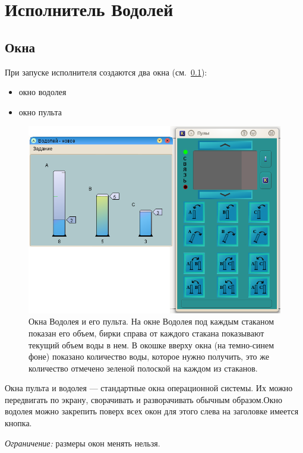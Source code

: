 \chapter*{Исполнитель Водолей}
\addtocounter{chapter}{1}


\section{Окна}

При запуске исполнителя создаются два окна (см.~\ref{vodoley}):
\begin{itemize}
\item окно водолея
\item окно пульта
\end{itemize}
\begin{figure}[h]
	\begin{center}
		\includegraphics[scale=0.6]{vodoley.png}
	\end{center}
	\caption{Окна Водолея и его пульта. На окне Водолея под каждым стаканом показан его объем, бирки справа от каждого стакана показывают текущий объем воды в нем. В окошке вверху окна (на темно-синем фоне) показано количество воды, которое нужно получить, это же количество отмечено зеленой полоской на каждом из стаканов.}
\label{vodoley}
\end{figure}
Окна пульта и водолея --- стандартные окна операционной системы. Их можно передвигать по экрану, сворачивать и разворачивать обычным образом.Окно водолея можно закрепить поверх всех окон для этого слева на заголовке имеется кнопка.

\emph{Ограничение:} размеры окон менять нельзя.

